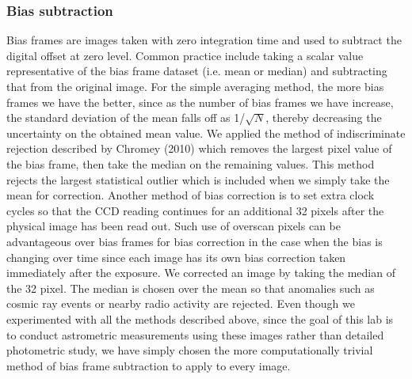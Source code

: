 \documentclass[authoryear, 12pt,5p, times]{elsarticle}
\begin{document}
\subsubsection{Bias subtraction}
Bias frames are images taken with zero integration time and used to subtract the digital offset at zero level. Common practice include taking a scalar value representative of the bias frame dataset (i.e. mean or median) and subtracting that from the original image. For the simple averaging method, the more bias frames we have the better, since as the number of bias frames we have increase, the standard deviation of the mean falls off as 1/$\sqrt{N}$, thereby decreasing the uncertainty on the obtained mean value.  We applied the method of indiscriminate rejection described by Chromey (2010) which removes the largest pixel value of the bias frame, then take the median on the remaining values. This method rejects the largest statistical outlier which is included when we simply take the mean for correction. Another method of bias correction is to set extra clock cycles so that the CCD reading continues for an additional 32 pixels after the physical image has been read out. Such  use of overscan pixels can be advantageous over bias frames for bias correction in the case when the bias is changing over time since each image has its own bias correction taken immediately after the exposure. We corrected an image by taking the median of the 32 pixel. The median is chosen over the mean so that anomalies such as cosmic ray events or nearby radio activity are rejected. Even though we experimented with all the methods described above, since the goal of this lab is to conduct astrometric measurements using these images rather than detailed photometric study,  we have simply chosen the more computationally trivial method of bias frame subtraction to apply to every image. 			
\end{document}
